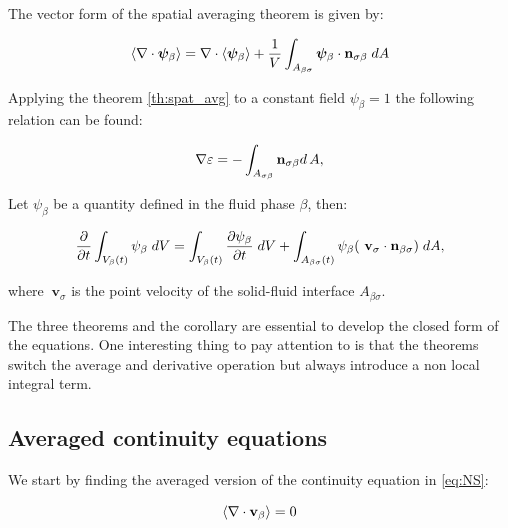 \begin{corollary}
	The vector form of the spatial averaging theorem is given by:
	
	\begin{equation}
	{\left< \nabla \cdot \boldsymbol{\psi}_{\beta} \right>} = \nabla \cdot {\left<  \boldsymbol{\psi}_{\beta} \right>} + \dfrac{1}{V} \int_{A_{\beta \sigma}}  \boldsymbol{\psi}_{\beta} \cdot \mathbf{n}_{\sigma \beta} \;dA
			\label{th:vec_spat_avg}
	\end{equation}
\end{corollary}

\begin{corollary}
	Applying the theorem \eqref{th:spat_avg} to a constant field $\psi_{\beta} = 1$ the following relation can be found:
	
	\begin{equation}
		\nabla \varepsilon = - \int_{A_{\sigma \beta}} \mathbf{n}_{\sigma \beta} d \, A,
	\end{equation}
\end{corollary}

\newpage

\begin{theorem}
	Let $\psi_{\beta}$ be a quantity defined in the fluid phase $\beta$, then:
	
	\begin{equation}
	\dfrac{\partial}{\partial t} \int_{V_\beta(t)} \psi_{\beta} \; dV =  \int_{V_\beta(t)} \dfrac{\partial \psi_{\beta}}{\partial t} \; dV + \int_{A_{\beta \sigma}(t)} \psi_{\beta} ( \mathbf{\ v}_{\sigma} \cdot \mathbf{n}_{\beta \sigma} ) \;dA,
	\label{th:transport}
	\end{equation}
	
	\noindent where $\mathbf{\ v}_{\sigma}$ is the point velocity of the solid-fluid interface $A_{\beta \sigma}$.
\end{theorem}

The three theorems and the corollary are essential to develop the closed form of the equations.
One interesting thing to pay attention to is that the theorems switch the average and derivative operation but always introduce a non local integral term.

\subsection{Averaged continuity equations}
We start by finding the averaged version of the continuity equation in \eqref{eq:NS}:

\begin{equation}
{\left< \nabla \cdot \textbf{v}_{\beta}\right>}   = 0
\label{eq:superf_avg_cont}
\end{equation}

